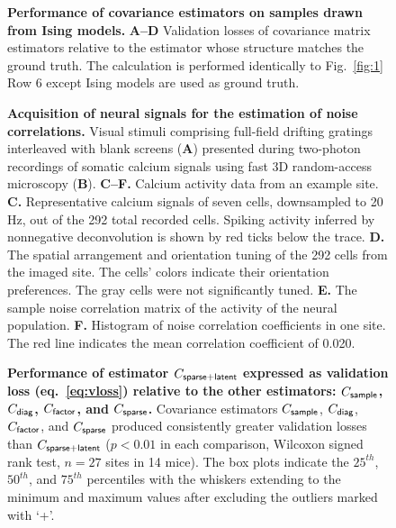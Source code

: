 \begin{figure} 
\caption{
{\bf Performance of covariance estimators on samples drawn from Ising models.} 
{\bf A--D} Validation losses of covariance matrix estimators relative to the estimator whose structure matches the ground truth. The calculation is performed identically to Fig.~\ref{fig:1} Row 6 except Ising models are used as ground truth. 
}
\label{fig:2}
\end{figure}

\begin{figure}
\caption{{\bf Acquisition of neural signals for the estimation of noise correlations.}
Visual stimuli comprising full-field drifting gratings interleaved with blank screens ({\bf A}) presented during two-photon recordings of somatic calcium signals using fast 3D random-access microscopy ({\bf B}).
{\bf C--F.} Calcium activity data from an example site.
{\bf C.} Representative calcium signals of seven cells, downsampled to 20 Hz, out of the 292 total recorded cells. Spiking activity inferred by nonnegative deconvolution is shown by red ticks below the trace.
{\bf D.} The spatial arrangement and orientation tuning of the 292 cells from the imaged site. The cells' colors indicate their orientation preferences. The gray cells were not significantly tuned.
{\bf E.} The sample noise correlation matrix of the activity of the neural population.
{\bf F.} Histogram of noise correlation coefficients in one site. The red line indicates the mean correlation coefficient of 0.020.
} \label{fig:3}
\end{figure}

\begin{figure}
\caption{
{\bf Performance of estimator $C_{\sf sparse+latent}$ expressed as validation loss (eq.~\ref{eq:vloss}) relative to the other estimators: $C_{\sf sample}$, $C_{\sf diag}$, $C_{\sf factor}$, and $C_{\sf sparse}$.}
Covariance estimators $C_{\sf sample}$, $C_{\sf diag}$, $C_{\sf factor}$, and $C_{\sf sparse}$ produced consistently greater validation losses than $C_{\sf sparse+latent}$ ($p<0.01$ in each comparison, Wilcoxon signed rank test, $n=27$ sites in 14 mice). The box plots indicate the $25^{th}$, $50^{th}$, and $75^{th}$ percentiles with the whiskers extending to the minimum and maximum values after excluding the outliers marked with `+'.
} \label{fig:4}
\end{figure}

